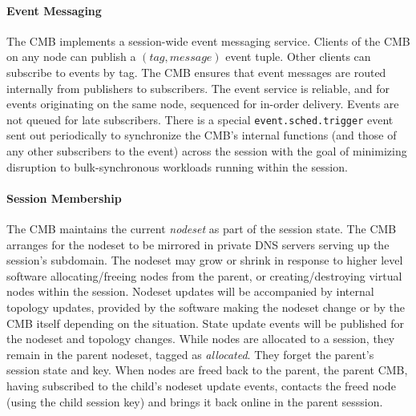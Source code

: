 \paragraph{Event Messaging}
\ifcomments
{}
\fi
The CMB implements a session-wide event messaging service.
Clients of the CMB on any node can publish a $(tag, message)$ event tuple.
Other clients can subscribe to events by tag.  The CMB ensures that
event messages are routed internally from publishers to subscribers.
The event service is reliable, and for events originating on the same node,
sequenced for in-order delivery.
Events are not queued for late subscribers.
There is a special {\tt event.sched.trigger} event sent out periodically
to synchronize the CMB's internal functions (and those of any other
subscribers to the event) across the session with the goal of minimizing
disruption to bulk-synchronous workloads running within the session.

\paragraph{Session Membership}
The CMB maintains the current {\em nodeset} as part of the session state.
The CMB arranges for the nodeset to be mirrored in private DNS servers
serving up the session's subdomain.
The nodeset may grow or shrink in response to higher level software
allocating/freeing nodes from the parent, or creating/destroying 
virtual nodes within the session.
Nodeset updates will be accompanied by internal topology updates, provided by
the software making the nodeset change or by the CMB itself depending
on the situation.
State update events will be published for the nodeset and topology changes.
While nodes are allocated to a session, they remain in the parent nodeset,
tagged as {\em allocated}.  They forget the parent's session state and key.
When nodes are freed back to the parent, the parent CMB, having subscribed
to the child's nodeset update events, contacts the freed node (using the
child session key) and brings it back online in the parent sesssion.  

